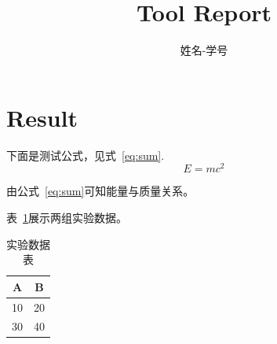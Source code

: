 \documentclass{article}
\begin{document}
\title{Tool Report}
\author{姓名-学号}
\maketitle

\section{Result}

下面是测试公式，见式~\eqref{eq:sum}.
\begin{equation}
E = mc^2
\label{eq:sum}
\end{equation}

由公式~\ref{eq:sum}可知能量与质量关系。

表~\ref{tab:data}展示两组实验数据。
\begin{table}[h]
\centering
\caption{实验数据表}
\label{tab:data}
\begin{tabular}{|c|c|}
\hline
A & B \\
\hline
10 & 20 \\
\hline
30 & 40 \\
\hline
\end{tabular}
\end{table}
\end{document}
